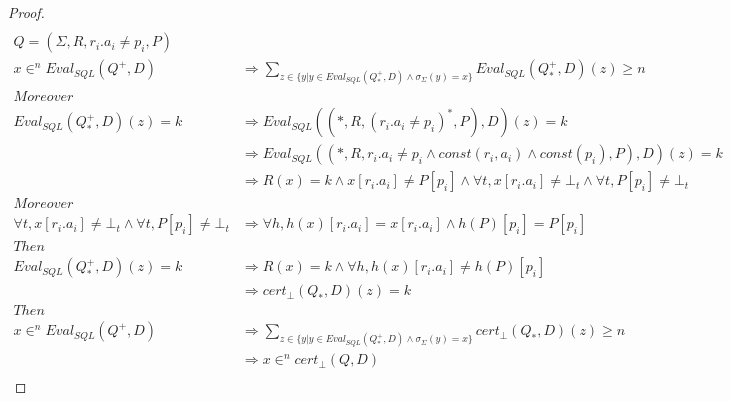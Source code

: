 \begin{proof}
\begin{align*}
	\end{align*}
	\begin{align*}
		Q = (\Sigma,R,r_i.a_i \neq p_i,P) \\
		x \in^n Eval_{SQL}(Q^+,D) & \Rightarrow \sum_{z \in \{y | y \in Eval_{SQL}(Q_*^+,D) \land \sigma_\Sigma(y) = x \} }{Eval_{SQL}(Q_*^+,D)(z)} \geq n  \\
		Moreover\\
		Eval_{SQL}(Q^+_*,D)(z)  = k & \Rightarrow  Eval_{SQL}((*,R,(r_i.a_i \neq p_i )^*,P),D)(z)  = k \\
		& \Rightarrow Eval_{SQL}((*,R,r_i.a_i \neq p_i \land const(r_i,a_i) \land const(p_i),P),D)(z)  = k \\
		& \Rightarrow R(x) = k \land x[r_i.a_i] \neq P[p_i] \land \forall t, x[r_i.a_i] \neq \bot_t \land \forall t, P[p_i] \neq \bot_t \\
		Moreover \\
		\forall t, x[r_i.a_i] \neq \bot_t \land \forall t, P[p_i] \neq \bot_t & \Rightarrow \forall h, h(x)[r_i.a_i] = x[r_i.a_i] \land h(P)[p_i] = P[p_i] \\
		Then \\
		Eval_{SQL}(Q^+_*,D)(z)  = k & \Rightarrow R(x) = k \land \forall h, h(x)[r_i.a_i] \neq h(P)[p_i] \\
		& \Rightarrow cert_\bot(Q_*,D)(z) = k \\
		Then \\
		x \in^n Eval_{SQL}(Q^+,D) & \Rightarrow \sum_{z \in \{y | y \in Eval_{SQL}(Q_*^+,D) \land \sigma_\Sigma(y) = x \} }{cert_\bot(Q_*,D)(z)} \geq n  \\
		& \Rightarrow x \in^n cert_\bot(Q,D) \\
	\end{align*}
\end{proof}

